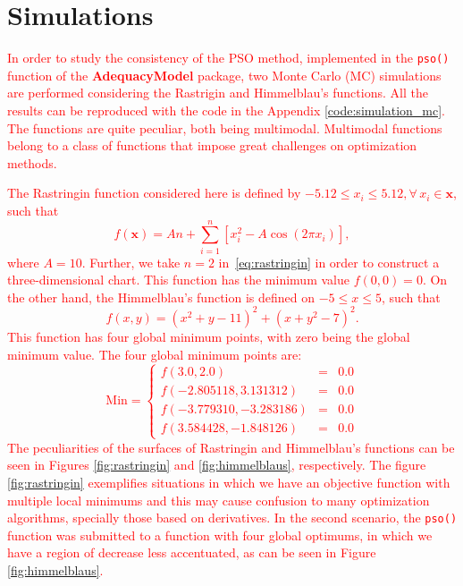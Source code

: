 \documentclass[10pt,letterpaper]{article}
\begin{document}
\section{Simulations}

\textcolor{red}{In order to study the consistency of the PSO method, implemented in the \texttt{pso()} function of the \textbf{AdequacyModel} package, two Monte Carlo (MC) simulations are performed con\-si\-der\-ing the Rastrigin and Himmelblau's functions. All the results can be reproduced with the code in the Appendix \ref{code:simulation_mc}. The functions are quite peculiar, both being multimodal. Mul\-ti\-mo\-dal functions belong to a class of functions that impose great challenges on optimization methods.}
	
\textcolor{red}{The Rastringin function considered here is defined by $-5.12 \leq x_i \leq 5.12, \forall\, x_i \in \bm{x}$, such that
\begin{equation}
f(\bm{x}) = An + \sum_{i = 1}^{n} [x_i^2 - A\cos(2\pi x_i) ],
\label{eq:rastringin}
\end{equation}
}
\textcolor{red}{where $A = 10$. Further, we take $n=2$ in~\eqref{eq:rastringin} in order to construct a three-dimensional chart. This function has the minimum value $ f(0, 0) = 0 $. On the other hand, the Himmelblau's function is defined on $ -5 \leq x \leq 5 $, such that
\begin{equation}
f(x, y) = (x^2 + y -11)^2 + (x + y^2 - 7)^2.
\label{eq:himmelblaus}
\end{equation}
}
\textcolor{red}{This function has four global minimum points, with zero being the global minimum value. The four global minimum points are:
$$
\mathrm{Min} = \left \{
\begin{array}{rcc}
f(3.0, 2.0) & = & 0.0 \\
f(-2.805118, 3.131312) & = & 0.0 \\
f(-3.779310, -3.283186) & = & 0.0 \\
f(3.584428, -1.848126) & = & 0.0
\end{array} 
\right.
$$
}
\textcolor{red}{The peculiarities of the surfaces of Rastringin and Himmelblau's functions can be seen in Figures \ref{fig:rastringin} and \ref{fig:himmelblaus}, respectively. The figure \ref{fig:rastringin} exemplifies situations in which we have an objective function with multiple local minimums and this may cause confusion to many optimization algorithms, specially those based on derivatives. In the second scenario, the \texttt{pso()} function was submitted to a function with four global optimums, in which we have a region of decrease less accentuated, as can be seen in Figure \ref{fig:himmelblaus}.}
\end{document}
